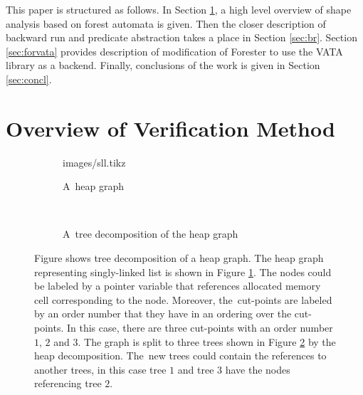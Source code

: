\documentclass[fleqn,11pt]{ExcelAtFIT} %
\begin{document}
This paper is structured as follows.
In Section \ref{sec:overview}, a high level overview of shape analysis based on forest automata
is given.
Then the closer description of backward run and predicate abstraction takes a place in Section \ref{sec:br}.
Section \ref{sec:forvata} provides description of modification of Forester to use the VATA library as a backend.
Finally, conclusions of the work is given in Section \ref{sec:concl}.

\section{Overview of Verification Method}
\label{sec:overview}

\begingroup
{}%
\begin{figure*}[t]
	\centering
	\begin{subfigure}{0.5\textwidth}
	\centering
		 {images/sll.tikz}
		\vspace{0.55cm}
		\caption{A~heap graph}
		\label{subfig:graph}
	\end{subfigure}%
	~
	\hspace{0.5cm}
	\begin{subfigure}{0.5\textwidth}
	\centering
		
		\caption{A~tree decomposition of the heap graph}
		\label{subfig:trees}
	\end{subfigure}%
	\vspace{0.5cm}
	\caption{
	Figure shows tree decomposition of a heap graph.
	The heap graph representing singly-linked list is shown in Figure \ref{subfig:graph}.
	The nodes could be labeled by a pointer variable that references allocated memory cell
	corresponding to the node.
	Moreover, the~cut-points are labeled by an order number that they have in an ordering over
	the cut-points.
	In this case, there are three cut-points with an order number $1$, $2$ and $3$.
	The graph is split to three trees shown in Figure \ref{subfig:trees} by the heap decomposition.
	The~new trees could contain the references to another trees, in this case tree $1$ and tree $3$
	have the nodes referencing tree $2$.}
	\label{fig:graph}
\end{figure*}
\endgroup
\end{document}
